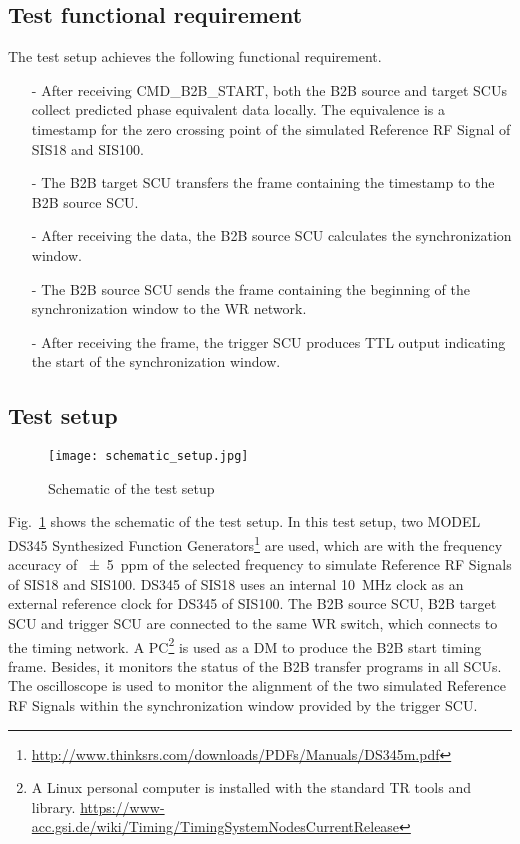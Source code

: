 \subsection{Test functional requirement}
The test setup achieves the following functional requirement.
\begin{itemize}
\item[-] After receiving CMD\_B2B\_START, both the B2B source and target SCUs collect predicted phase equivalent data locally. The equivalence is a timestamp for the zero crossing point of the simulated Reference RF Signal of SIS18 and SIS100. 
\item[-] The B2B target SCU transfers the frame containing the timestamp to the B2B source SCU.
\item[-] After receiving the data, the B2B source SCU calculates the synchronization window.
\item[-] The B2B source SCU sends the frame containing the beginning of the synchronization window to the WR network.
\item[-] After receiving the frame, the trigger SCU produces TTL output indicating the start of the synchronization window. 
\end{itemize}

\subsection{Test setup}

\begin{figure}[H]
   \centering   
   \texttt{[image: schematic\_setup.jpg]}
   \caption{Schematic of the test setup}
   \label{setup}
\end{figure}

Fig.~\ref{setup} shows the schematic of the test setup. In this test setup, two MODEL DS345 Synthesized Function Generators\footnote{\url{http://www.thinksrs.com/downloads/PDFs/Manuals/DS345m.pdf}} are used, which are with the frequency accuracy of \SI{+-5}{ppm} of the selected frequency to simulate Reference RF Signals of SIS18 and SIS100. DS345 of SIS18 uses an internal \SI{10}{\MHz} clock as an external reference clock for DS345 of SIS100. The B2B source SCU, B2B target SCU and trigger SCU are connected to the same WR switch, which connects to the timing network. A \gls{PC}\footnote{A Linux personal computer is installed with the standard TR tools and library. \newline\url{https://www-acc.gsi.de/wiki/Timing/TimingSystemNodesCurrentRelease}} is used as a DM to produce the B2B start timing frame. Besides, it monitors the status of the  B2B transfer programs in all SCUs. The oscilloscope is used to monitor the alignment of the two simulated Reference RF Signals within the synchronization window provided by the trigger SCU.   

